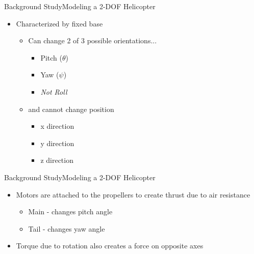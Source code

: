 \documentclass{beamer}
\begin{document}
\begin{frame}{Background Study}{Modeling a 2-DOF Helicopter} %
    \begin{itemize}
        \item Characterized by fixed base
        \begin{itemize}
            \item Can change 2 of 3 possible orientations...
            \begin{itemize}
                \item Pitch ($\theta$)
                \item Yaw ($\psi$)
                \item \emph{Not Roll}
            \end{itemize}
            \item and cannot change position
            \begin{itemize}
                \item x direction
                \item y direction
                \item z direction
            \end{itemize}
        \end{itemize} 
    \end{itemize}
\end{frame}



\begin{frame}{Background Study}{Modeling a 2-DOF Helicopter}
    \begin{itemize}
        \item Motors are attached to the propellers to create thrust due to air resistance
            \begin{itemize}
                \item Main - changes pitch angle
                \item Tail - changes yaw angle
            \end{itemize} 
        \item Torque due to rotation also creates a force on opposite axes 
    \end{itemize}
\end{frame}
\end{document}
